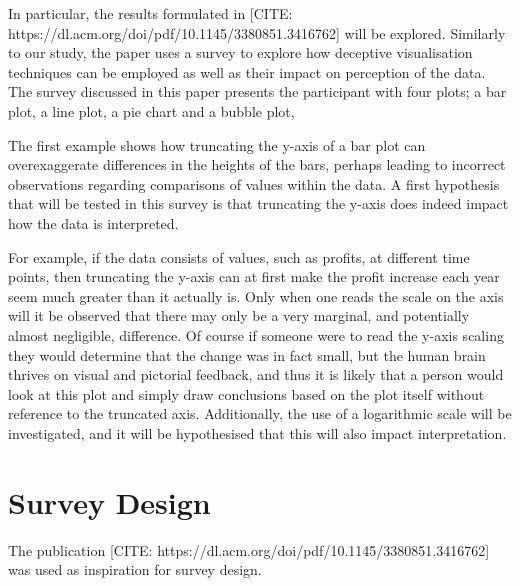 In particular, the results formulated in [CITE: https://dl.acm.org/doi/pdf/10.1145/3380851.3416762] will
be explored. Similarly to our study, the paper uses a survey to explore how deceptive visualisation techniques can be employed as well as their impact 
on perception of the data. The survey discussed in this paper presents the participant with four plots; a bar plot, a line plot, a pie chart and a 
bubble plot, 









The first example shows how truncating the y-axis of a bar plot can overexaggerate differences in the heights of the bars, perhaps leading to incorrect 
observations regarding comparisons of values within the data. A first hypothesis that will be tested in this survey is that truncating the y-axis
does indeed impact how the data is interpreted.

For example, if the data consists of values, such as profits, at different time points, then truncating 
the y-axis can at first make the profit increase each year seem much greater than it actually is. Only when one reads the scale on the 
axis will it be observed that there may only be a very marginal, and potentially almost negligible, difference. Of course if someone 
were to read the y-axis scaling they would determine that the change was in fact small, but the human brain thrives on visual and 
pictorial feedback, and thus it is likely that a person would look at this plot and simply draw conclusions based on the plot itself
without reference to the truncated axis.  Additionally, the use of a logarithmic scale will be investigated, and it will
be hypothesised that this will also impact interpretation.



\section{Survey Design}

The publication [CITE: https://dl.acm.org/doi/pdf/10.1145/3380851.3416762] was used as inspiration for survey design.

